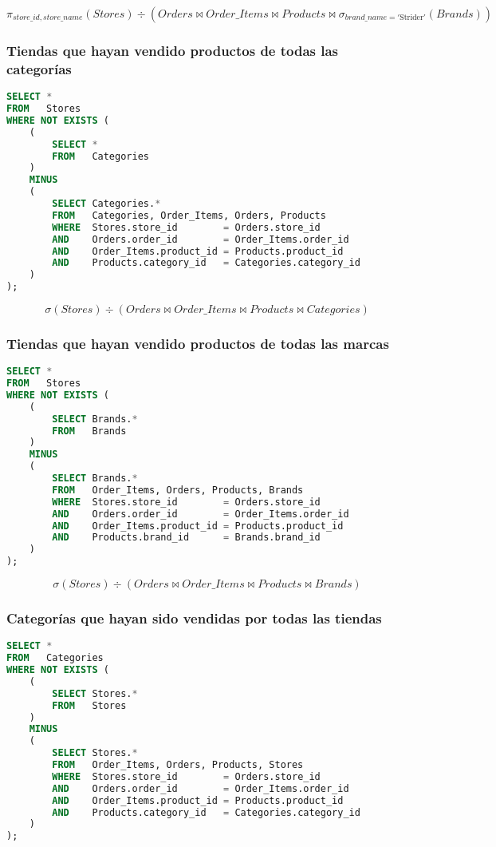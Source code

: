 \[\pi_{store\_id,store\_name}(Stores)\div(Orders\bowtie Order\_Items\bowtie Products\bowtie\sigma_{brand\_name='\text{Strider}'}(Brands))\]

\subsubsection{Tiendas que hayan vendido productos de todas las categorías}

\begin{lstlisting}[language=SQL]
SELECT *
FROM   Stores
WHERE NOT EXISTS (
	(
		SELECT *
		FROM   Categories
	)
	MINUS
	(
		SELECT Categories.*
		FROM   Categories, Order_Items, Orders, Products
		WHERE  Stores.store_id        = Orders.store_id
		AND    Orders.order_id        = Order_Items.order_id
		AND    Order_Items.product_id = Products.product_id
		AND    Products.category_id   = Categories.category_id
	)
);
\end{lstlisting}

\[\sigma(Stores)\div(Orders\bowtie Order\_Items\bowtie Products\bowtie Categories)\]

\pagebreak

\subsubsection{Tiendas que hayan vendido productos de todas las marcas}

\begin{lstlisting}[language=SQL]
SELECT *
FROM   Stores
WHERE NOT EXISTS (
	(
		SELECT Brands.*
		FROM   Brands
	)
	MINUS
	(
		SELECT Brands.*
		FROM   Order_Items, Orders, Products, Brands
		WHERE  Stores.store_id        = Orders.store_id
		AND    Orders.order_id        = Order_Items.order_id
		AND    Order_Items.product_id = Products.product_id
		AND    Products.brand_id      = Brands.brand_id
	)
);
\end{lstlisting}

\[\sigma(Stores)\div(Orders\bowtie Order\_Items\bowtie Products\bowtie Brands)\]

\subsubsection{Categorías que hayan sido vendidas por todas las tiendas}

\begin{lstlisting}[language=SQL]
SELECT *
FROM   Categories
WHERE NOT EXISTS (
	(
		SELECT Stores.*
		FROM   Stores
	)
	MINUS
	(
		SELECT Stores.*
		FROM   Order_Items, Orders, Products, Stores
		WHERE  Stores.store_id        = Orders.store_id
		AND    Orders.order_id        = Order_Items.order_id
		AND    Order_Items.product_id = Products.product_id
		AND    Products.category_id   = Categories.category_id
	)
);
\end{lstlisting}

